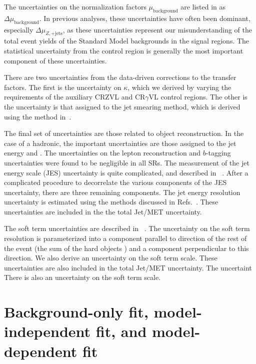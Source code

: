 The uncertainties on the normalization factors $\mu_{\text{background}}$ are listed in  as $\Delta\mu_{\text{background}}$.
In previous analyses, these uncertainties have often been dominant, especially $\Delta\mu_{Z,\mathrm{+jets}}$, as these uncertainties represent our misunderstanding of the total event yields of the Standard Model backgrounds in the signal regions.
The statistical uncertainty from the control region is generally the most important component of these uncertainties.

There are two uncertainties from the data-driven corrections to the transfer factors.
The first is the uncertainty on $\kappa$, which we derived by varying the \met requirements of the auxiliary CRZVL and CR$\gamma$VL control regions.
The other is the uncertainty is that assigned to the jet smearing method, which is derived using the method in~\cite{SUSY-2011-20}.

The final set of uncertainties are those related to object reconstruction.
In the case of a hadronic, the important uncertainties are those assigned to the jet energy and \met.
The uncertainties on the lepton reconstruction and $b$-tagging uncertainties were found to be negligible in all SRs.
The measurement of the jet energy scale (JES) uncertainty is quite complicated, and described in ~\cite{Aad:2011he,Aad:2012vm,ATL-PHYS-PUB-2015-015}.
After a complicated procedure to decorrelate the various components of the JES uncertainty, there are three remaining components.
The jet energy resolution uncertainty is estimated using the methods discussed in Refs.~\cite{Aad:2012ag,ATL-PHYS-PUB-2015-015}.
These uncertainties are included in the the total Jet/MET uncertainty.

The \met soft term uncertainties are described in ~\cite{PERF-2014-04,ATL-PHYS-PUB-2015-023,ATL-PHYS-PUB-2015-027}.
The uncertainty on the \met soft term resolution is parameterized into a component parallel to direction of the rest of the event (the sum of the hard objects \pt) and a component perpendicular to this direction.
We also derive an uncertainty on the \met soft term scale.
These uncertainties are also included in the total Jet/MET uncertainty.
The uncertaint
There is also an uncertainty on the \met soft term scale.

\section{Background-only fit, model-independent fit, and model-dependent fit}

